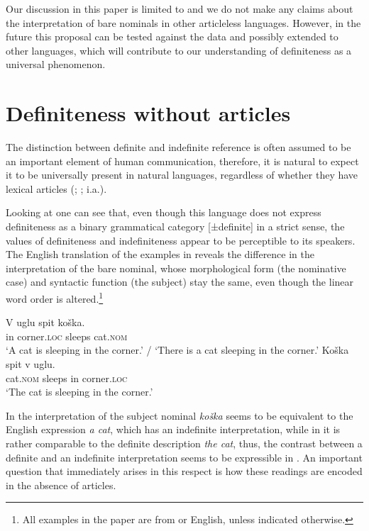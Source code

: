 \documentclass[output=paper,
colorlinks,
citecolor=brown,
newtxmath
]{langscibook}
\begin{document}
Our discussion in this paper is limited to  and we do not make any claims
about the interpretation of bare nominals in other articleless languages. However, in the future this proposal can be tested against the data and possibly extended to other languages, which will contribute to our understanding of definiteness as a universal phenomenon.

\section{Definiteness without articles}
\label{sec:definiteness-without-articles}
The distinction between definite and indefinite reference is often assumed to be an important element of human communication, therefore, it is natural to expect it to be universally present in natural languages, regardless of whether they have lexical articles (\citealt{Brun2001}; %
\citealt{Zlatic2014}; i.a.).

Looking at  one can see that, even though this language does not express definiteness as a binary %
grammatical category [±definite] in a strict sense, the values of definiteness and indefiniteness %
appear to be perceptible to its speakers. The English translation of the  examples in  reveals the difference in the interpretation of the bare nominal, whose morphological form (the nominative case) and syntactic function (the subject) stay the same, even though the linear word order is altered.\footnote{All examples in the paper are from  or English, unless indicated otherwise.}

\ea \label{koshka}
\ea \label{ex:seres:1a} \gll V uglu spit koška.\\
         in corner.\textsc{loc} sleeps cat.\textsc{nom}\\
\glt    `A cat is sleeping in the corner.' / `There is a cat sleeping in the corner.'
\ex \label{ex:seres:1b}
 \gll Koška	spit v uglu. \\
    cat.\textsc{nom} 	sleeps 	in 	corner.\textsc{loc} \\
 \glt   `The cat is sleeping in the corner.'
\z\z

\noindent In  the interpretation of the subject nominal \textit{koška} seems to be equivalent to the English expression \textit{a cat}, which has an indefinite interpretation, while in  it is rather comparable to the definite description \textit{the cat}, thus, the contrast between a definite and an indefinite interpretation seems to be
expressible in . An important question that immediately arises in this respect is how these readings are encoded in the absence of articles.
\end{document}

